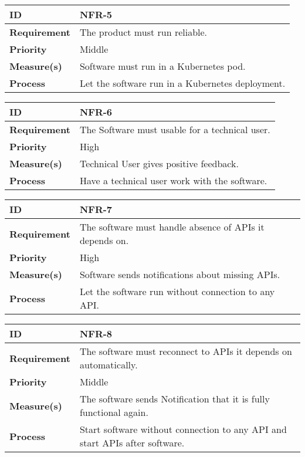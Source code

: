 \begin{center}
\begin{tabular}{ | m{8em} | m{25em}| } 
 \hline
 \textbf{ID} & NFR-5\\ 
 \hline
 \textbf{Requirement} & The product must run reliable.\\
 \hline
 \textbf{Priority} & Middle\\
 \hline
 \textbf{Measure(s)} & Software must run in a Kubernetes pod.\\
 \hline
 \textbf{Process} & Let the software run in a Kubernetes deployment.\\
 \hline
\end{tabular}
\end{center}

\begin{center}
\begin{tabular}{ | m{8em} | m{25em}| } 
 \hline
 \textbf{ID} & NFR-6\\ 
 \hline
 \textbf{Requirement} & The Software must usable for a technical user.\\
 \hline
 \textbf{Priority} & High \\
 \hline
 \textbf{Measure(s)} & Technical User gives positive feedback.\\
 \hline
 \textbf{Process} & Have a technical user work with the software.\\
 \hline
\end{tabular}
\end{center}

\begin{center}
\begin{tabular}{ | m{8em} | m{25em}| } 
 \hline
 \textbf{ID} & NFR-7\\ 
 \hline
 \textbf{Requirement} & The software must handle absence of APIs it depends on.\\
 \hline
 \textbf{Priority} & High \\
 \hline
 \textbf{Measure(s)} & Software sends notifications about missing APIs.\\
 \hline
 \textbf{Process} & Let the software run without connection to any API.\\
 \hline
\end{tabular}
\end{center}

\begin{center}
\begin{tabular}{ | m{8em} | m{25em}| } 
 \hline
 \textbf{ID} & NFR-8\\ 
 \hline
 \textbf{Requirement} & The software must reconnect to APIs it depends on automatically.\\
 \hline
 \textbf{Priority} & Middle \\
 \hline
 \textbf{Measure(s)} & The software sends Notification that it is fully functional again.\\
 \hline
 \textbf{Process} & Start software without connection to any API and start APIs after software.\\
 \hline
\end{tabular}
\end{center}

